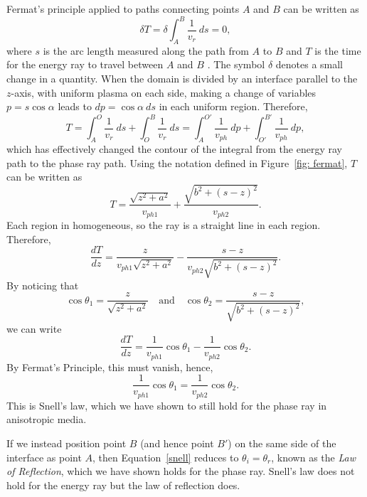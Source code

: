 \documentclass[12pt]{../style-files/ociamthesis}
\begin{document}
	Fermat's principle applied to paths connecting points $A$ and $B$ can be written as
	\begin{equation}
	\delta T = \delta \int_A^B \frac{1}{v_r} ~ds = 0,
	\end{equation}
	where $s$ is the arc length measured along the path from $A$ to $B$ and $T$ is the time for the energy ray to travel between $A$ and $B$ \citep{bor_etal99}. The symbol $\delta$ denotes a small change in a quantity. When the domain is divided by an interface parallel to the $z$-axis, with uniform plasma on each side, making a change of variables $p = s \cos{\alpha}$ leads to $dp = \cos{\alpha} ~ds$ in each uniform region. Therefore, 
	\begin{equation}
	T = \int_A^O \frac{1}{v_r} ~ds + \int_O^B \frac{1}{v_r} ~ds = \int_A^{O'} \frac{1}{v_{ph}} ~dp + \int_{O'}^{B'} \frac{1}{v_{ph}} ~dp,
	\end{equation}
	which has effectively changed the contour of the integral from the energy ray path to the phase ray path. Using the notation defined in Figure~\ref{fig: fermat}, $T$ can be written as
	\begin{equation}
	T = \frac{\sqrt{z^2 + a^2}}{v_{ph1}} + \frac{\sqrt{b^2 + (s-z)^2}}{v_{ph2}}.
	\end{equation}
	Each region in homogeneous, so the ray is a straight line in each region. Therefore,
	\begin{equation}
	\frac{dT}{dz} = \frac{z}{v_{ph1}\sqrt{z^2 + a^2}} - \frac{s - z}{v_{ph2}\sqrt{b^2 + (s - z)^2}}.
	\end{equation}
	By noticing that
	\begin{equation}
	\cos{\theta_1} = \frac{z}{\sqrt{z^2 + a^2}} \quad \text{and} \quad \cos{\theta_2} = \frac{s - z}{\sqrt{b^2 + (s - z)^2}},
	\end{equation}
	we can write
	\begin{equation}
	\frac{dT}{dz} = \frac{1}{v_{ph1}}\cos{\theta_1} - \frac{1}{v_{ph2}}\cos{\theta_2}.
	\end{equation}
	By Fermat's Principle, this must vanish, hence,
	\begin{equation}
	\frac{1}{v_{ph1}}\cos{\theta_1} = \frac{1}{v_{ph2}}\cos{\theta_2}. \label{snell}
	\end{equation}
	This is Snell's law, which we have shown to still hold for the phase ray in anisotropic media.
	
	If we instead position point $B$ (and hence point $B'$) on the same side of the interface as point $A$, then Equation~\eqref{snell} reduces to $\theta_i = \theta_r$, known as the \textit{Law of Reflection}, which we have shown holds for the phase ray. Snell's law does not hold for the energy ray but the law of reflection does.
	
\end{document}
